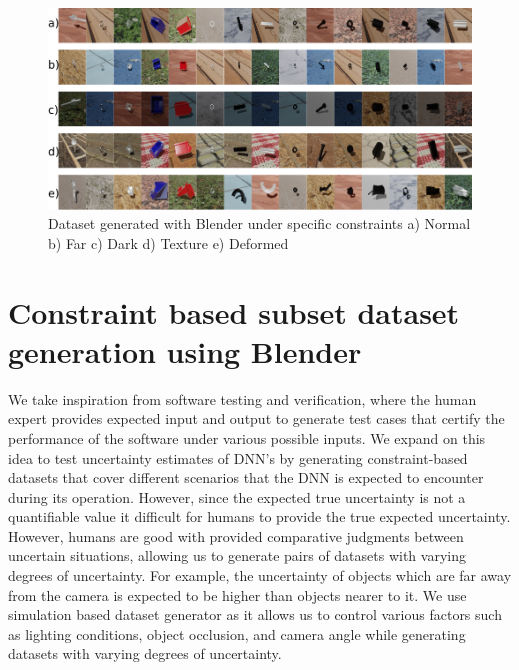 
\begin{figure}[t]
	\centering
	\includegraphics[width = \textwidth]{images/dataset_generation_v3.png}
	\caption{Dataset generated with Blender under specific constraints a) Normal b) Far c) Dark d) Texture e) Deformed}
	\label{fig:constraint_based_dataset_generation}
\end{figure}


\hypertarget{constraint-based-subset-dataset-generation-using-blender}{%
\section{Constraint based subset dataset generation using
Blender}\label{constraint-based-subset-dataset-generation-using-blender}}

We take inspiration from software testing and verification,
where the human expert provides expected input and output to generate test cases
that certify the performance of the software under various possible inputs. We expand on
this idea to test uncertainty estimates of DNN's by generating
constraint-based datasets that cover different scenarios that the DNN is
expected to encounter during its operation. However, since the expected
true uncertainty is not a quantifiable value it difficult for humans to
provide the true expected uncertainty. However, humans are good with
provided comparative judgments between uncertain situations, allowing us
to generate pairs of datasets with varying degrees of uncertainty. For
example, the uncertainty of objects which are far away from the camera
is expected to be higher than objects nearer to it. We use simulation
based dataset generator as it allows us to control various factors such
as lighting conditions, object occlusion, and camera angle while
generating datasets with varying degrees of uncertainty.




